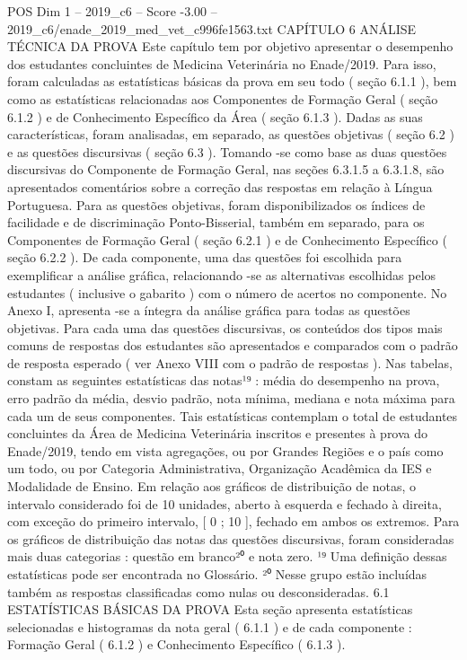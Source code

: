 \begin{textsample}{POS Dim 1 – 2019\_c6 – Score -3.00 – 2019\_c6/enade\_2019\_med\_vet\_c996fe1563.txt}  \label{ex:f1_pos_355}
CAPÍTULO 6 ANÁLISE TÉCNICA DA PROVA Este capítulo tem por objetivo apresentar o desempenho dos estudantes concluintes de Medicina Veterinária no Enade/2019.
Para isso, foram calculadas as estatísticas básicas da prova em seu todo ( seção 6.1.1 ), bem como as estatísticas relacionadas aos Componentes de Formação Geral ( seção 6.1.2 ) e de Conhecimento Específico da Área ( seção 6.1.3 ).
Dadas as suas características, foram analisadas, em separado, as questões objetivas ( seção 6.2 ) e as questões discursivas ( seção 6.3 ).
Tomando -se como base as duas questões discursivas do Componente de Formação Geral, nas seções 6.3.1.5 a 6.3.1.8, são apresentados comentários sobre a correção das respostas em relação à Língua Portuguesa.
Para as questões objetivas, foram disponibilizados os índices de facilidade e de discriminação Ponto-Bisserial, também em separado, para os Componentes de Formação Geral ( seção 6.2.1 ) e de Conhecimento Específico ( seção 6.2.2 ).
De cada componente, uma das questões foi escolhida para exemplificar a análise gráfica, relacionando -se as alternativas escolhidas pelos estudantes ( inclusive o gabarito ) com o número de acertos no componente.
No Anexo I, apresenta -se a íntegra da análise gráfica para todas as questões objetivas.
Para cada uma das questões discursivas, os conteúdos dos tipos mais comuns de respostas dos estudantes são apresentados e comparados com o padrão de resposta esperado ( ver Anexo VIII com o padrão de respostas ).
Nas tabelas, constam as seguintes estatísticas das notas¹⁹ : média do desempenho na prova, erro padrão da média, desvio padrão, nota mínima, mediana e nota máxima para cada um de seus componentes.
Tais estatísticas contemplam o total de estudantes concluintes da Área de Medicina Veterinária inscritos e presentes à prova do Enade/2019, tendo em vista agregações, ou por Grandes Regiões e o país como um todo, ou por Categoria Administrativa, Organização Acadêmica da IES e Modalidade de Ensino.
Em relação aos gráficos de distribuição de notas, o intervalo considerado foi de 10 unidades, aberto à esquerda e fechado à direita, com exceção do primeiro intervalo, [ 0 ; 10 ], fechado em ambos os extremos.
Para os gráficos de distribuição das notas das questões discursivas, foram consideradas mais duas categorias : questão em branco²⁰ e nota zero. ¹⁹ Uma definição dessas estatísticas pode ser encontrada no Glossário. ²⁰ Nesse grupo estão incluídas também as respostas classificadas como nulas ou desconsideradas. 6.1 ESTATÍSTICAS BÁSICAS DA PROVA Esta seção apresenta estatísticas selecionadas e histogramas da nota geral ( 6.1.1 ) e de cada componente : Formação Geral ( 6.1.2 ) e Conhecimento Específico ( 6.1.3 ).

\end{textsample}
